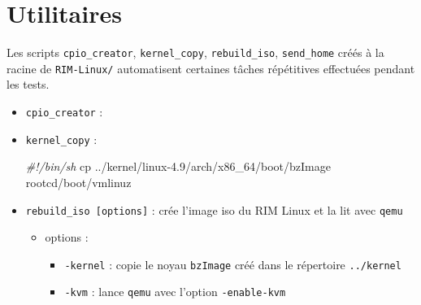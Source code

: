 \documentclass[]{article}
\newenvironment{Shaded}{}{}
\newcommand{\KeywordTok}[1]{\textcolor[rgb]{0.00,0.44,0.13}{\textbf{{#1}}}}
\newcommand{\StringTok}[1]{\textcolor[rgb]{0.25,0.44,0.63}{{#1}}}
\newcommand{\CommentTok}[1]{\textcolor[rgb]{0.38,0.63,0.69}{\textit{{#1}}}}
\newcommand{\FunctionTok}[1]{\textcolor[rgb]{0.02,0.16,0.49}{{#1}}}
\newcommand{\VariableTok}[1]{\textcolor[rgb]{0.10,0.09,0.49}{{#1}}}
\newcommand{\OperatorTok}[1]{\textcolor[rgb]{0.40,0.40,0.40}{{#1}}}
\newcommand{\BuiltInTok}[1]{{#1}}
\newcommand{\NormalTok}[1]{{#1}}
\providecommand{\tightlist}{%
  \setlength{\itemsep}{0pt}\setlength{\parskip}{0pt}}
\begin{document}
\section{Utilitaires}\label{utilitaires}

Les scripts \texttt{cpio\_creator}, \texttt{kernel\_copy},
\texttt{rebuild\_iso}, \texttt{send\_home} créés à la racine de
\texttt{RIM-Linux/} automatisent certaines tâches répétitives effectuées
pendant les tests.

\begin{itemize}
\item
  \texttt{cpio\_creator} :

\begin{Shaded}
\end{Shaded}
\item
  \texttt{kernel\_copy} :

\begin{Shaded}
\begin{Highlighting}[]
\CommentTok{#!/bin/sh}
\FunctionTok{cp} \NormalTok{../kernel/linux-4.9/arch/x86_64/boot/bzImage rootcd/boot/vmlinuz}
\end{Highlighting}
\end{Shaded}
\item
  \texttt{rebuild\_iso\ {[}options{]}} : crée l'image iso du RIM Linux
  et la lit avec \texttt{qemu}

  \begin{itemize}
  \tightlist
  \item
    options :

    \begin{itemize}
    \tightlist
    \item
      \texttt{-kernel} : copie le noyau \texttt{bzImage} créé dans le
      répertoire \texttt{../kernel}
    \item
      \texttt{-kvm} : lance \texttt{qemu} avec l'option
      \texttt{-enable-kvm}
    \end{itemize}
  \end{itemize}


\end{itemize}
\end{document}
